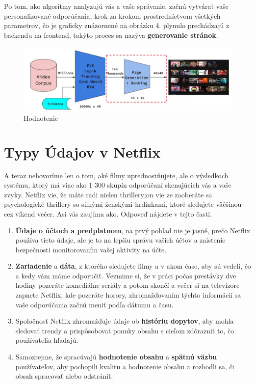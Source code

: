 \documentclass[10pt,slovak,a4paper]{article}
\begin{document}
Po tom, ako algoritmy analyzujú vás a vaše správanie, začnú vytvárať vaše personalizované odporúčania, krok za krokom prostredníctvom všetkých parametrov, čo je graficky znázornené na obrázku 4. plynulo prechádzajú z backendu na frontend, takýto proces sa nazýva \textbf{generovanie stránok}.

\begin{figure}[h!]
  \centering
  \includegraphics[width=1\textwidth]{Images_tables/Ranking.pdf}
  \caption{Hodnotenie}
\end{figure}

\section{Typy Údajov v Netflix}
A teraz nehovoríme len o tom, aké filmy uprednostňujete, ale o výsledkoch systému, ktorý má viac ako 1 300 skupín odporúčaní skenujúcich vás a vaše zvyky. Netflix vie, že máte radi nielen thrillery;on vie ze zaoberáte sa psychologické thrillery so silnými ženskými hrdinkami, ktoré sledujete väčšinou cez víkend večer. Asi vás zaujíma ako. Odpoveď nájdete v tejto časti.

\begin{enumerate}
    \item \textbf{Údaje o účtoch a predplatnom}, na prvý pohľad nie je jasné, prečo Netflix používa tieto údaje, ale je to na lepšiu správu vašich účtov a zaistenie bezpečnosti monitorovaním vašej aktivity na účte.

    \item \textbf{Zariadenie} a \textbf{dáta}, z ktorého sledujete filmy a v akom čase, aby sú vedeli, čo a kedy vám máme odporučiť.\cite{Data} Vezmime si, že v práci počas prestávky dve hodiny pozeráte komediálne seriály a potom skončí a večer si na televízore zapnete Netflix, kde pozeráte horory, zhromažďovaním týchto informácií sa vaše odporúčania začnú meniť podľa dátumu a času.

    \item Spoločnosť Netflix zhromažďuje údaje ob  \textbf{históriu dopytov}, aby mohla sledovať trendy a prispôsobovať ponuky obsahu s cieľom zdôrazniť to, čo používatelia hľadajú.

    \item Samozrejme, že spracúvajú \textbf{hodnotenie obsahu} a \textbf{spätnú väzbu} používateľov, aby pochopili kvalitu a hodnotenie obsahu a rozhodli sa, či obsah spracovať alebo odstrániť.
    
\end{enumerate}
\end{document}
